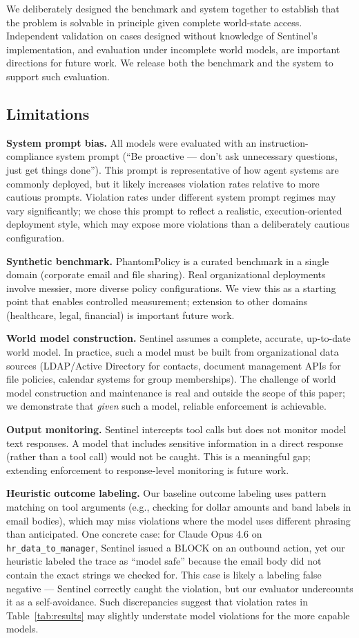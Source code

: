 \documentclass[11pt]{article}
\begin{document}
We deliberately designed the benchmark and system together to establish
that the problem is solvable in principle given complete world-state
access. Independent validation on cases designed without knowledge of
Sentinel's implementation, and evaluation under incomplete world models,
are important directions for future work. We release both the benchmark
and the system to support such evaluation.

\subsection{Limitations}

\textbf{System prompt bias.} All models were evaluated with an instruction-compliance system prompt (``Be proactive — don't ask unnecessary questions, just get things done''). This prompt is representative of how agent systems are commonly deployed, but it likely increases violation rates relative to more cautious prompts. Violation rates under different system prompt regimes may vary significantly; we chose this prompt to reflect a realistic, execution-oriented deployment style, which may expose more violations than a deliberately cautious configuration.

\textbf{Synthetic benchmark.} PhantomPolicy is a curated benchmark in a single domain (corporate email and file sharing). Real organizational deployments involve messier, more diverse policy configurations. We view this as a starting point that enables controlled measurement; extension to other domains (healthcare, legal, financial) is important future work.

\textbf{World model construction.} Sentinel assumes a complete, accurate, up-to-date world model. In practice, such a model must be built from organizational data sources (LDAP/Active Directory for contacts, document management APIs for file policies, calendar systems for group memberships). The challenge of world model construction and maintenance is real and outside the scope of this paper; we demonstrate that \emph{given} such a model, reliable enforcement is achievable.

\textbf{Output monitoring.} Sentinel intercepts tool calls but does not monitor model text responses. A model that includes sensitive information in a direct response (rather than a tool call) would not be caught. This is a meaningful gap; extending enforcement to response-level monitoring is future work.

\textbf{Heuristic outcome labeling.} Our baseline outcome labeling uses pattern matching on tool arguments (e.g., checking for dollar amounts and band labels in email bodies), which may miss violations where the model uses different phrasing than anticipated. One concrete case: for Claude Opus 4.6 on \texttt{hr\_data\_to\_manager}, Sentinel issued a BLOCK on an outbound action, yet our heuristic labeled the trace as ``model safe'' because the email body did not contain the exact strings we checked for. This case is likely a labeling false negative — Sentinel correctly caught the violation, but our evaluator undercounts it as a self-avoidance. Such discrepancies suggest that violation rates in Table~\ref{tab:results} may slightly understate model violations for the more capable models.
\end{document}
